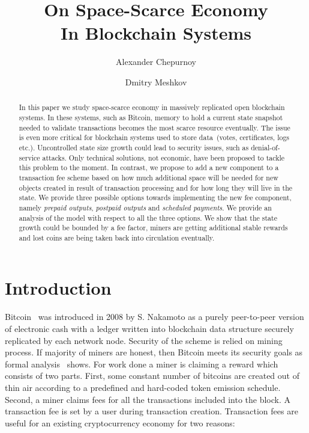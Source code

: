 \documentclass[]{llncs}   %
\begin{document}
\title{On Space-Scarce Economy\\ In Blockchain Systems}
\author{Alexander Chepurnoy \and Dmitry Meshkov}
\maketitle

\begin{abstract}
In this paper we study space-scarce economy in massively replicated open blockchain systems. In these systems, such as Bitcoin, memory to hold a current state snapshot needed to validate transactions becomes the most scarce resource eventually. The issue is even more critical for blockchain systems used to store data~(votes, certificates, logs etc.). Uncontrolled state size growth could lead to security issues, such as denial-of-service attacks. Only technical solutions, not economic, have been proposed to tackle this problem to the moment. In contrast, we propose to add a new component to a transaction fee scheme based on how much additional space will be needed for new objects created in result of transaction processing and for how long they will live in the state. We provide three possible options towards implementing the new fee component, namely \textit{prepaid outputs}, \textit{postpaid outputs} and \textit{scheduled payments}. We provide an analysis of the model with respect to all the three options. We show that the state growth could be bounded by a fee factor, miners are getting additional stable rewards and lost coins are being taken back into circulation eventually.    
\end{abstract}

\section{Introduction}

Bitcoin~\cite{Nakamoto2008} was introduced in 2008 by S. Nakamoto as a purely peer-to-peer version of electronic cash with a ledger written into blockchain data structure securely replicated by each network node. Security of the scheme is relied on mining process. If majority of miners are honest, then Bitcoin meets its security goals as formal analysis~\cite{Garay2015} shows. For work done a miner is claiming a reward which consists of two parts. First, some constant number of bitcoins are created out of thin air according to a predefined and hard-coded token emission schedule. Second, a miner claims fees for all the transactions included into the block. A transaction fee is set by a user during transaction creation. Transaction fees are useful for an existing cryptocurrency economy for two reasons:
\end{document}
